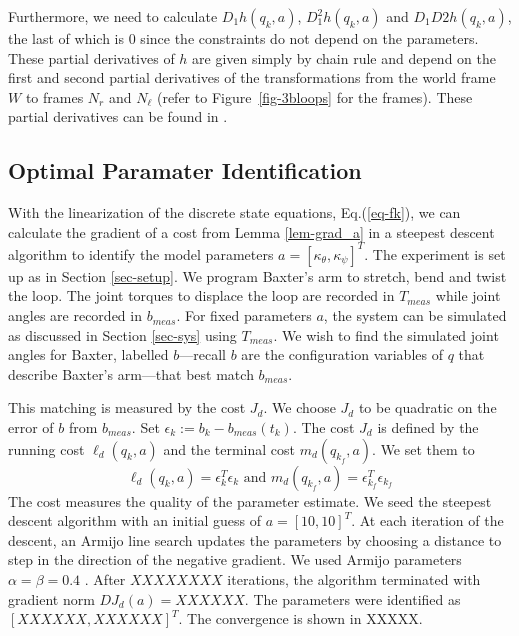 \documentclass[letterpaper, 10pt, conference]{ieeeconf}
\begin{document}
Furthermore, we need to calculate $D_1h(q_k,a)$, $D_1^2h(q_k,a)$ and $D_1D2h(q_k,a)$, the last of which is $0$ since the constraints do not depend on the parameters.  These partial derivatives of $h$ are given simply by chain rule and depend on the first and second partial derivatives of the transformations from the world frame $W$ to frames $N_r$ and $N_\ell$ (refer to Figure~\ref{fig-3bloops} for the frames).  These partial derivatives can be found in \cite{johnson_murphey_linearization}.  

\subsection{Optimal Paramater Identification}

With the linearization of the discrete state equations, Eq.(\ref{eq-fk}), we can calculate the gradient of a cost from Lemma \ref{lem-grad_a} in a steepest descent algorithm to identify the model parameters $a = [\kappa_\theta,\kappa_\psi]^T$.  The experiment is set up as in Section \ref{sec-setup}.  We program Baxter's arm to stretch, bend and twist the loop.  The joint torques to displace the loop are recorded in $T_{meas}$ while joint angles are recorded in $b_{meas}$.    For fixed parameters $a$, the system can be simulated as discussed in Section \ref{sec-sys} using $T_{meas}$.  We wish to find the simulated joint angles for Baxter, labelled $b$---recall $b$ are the configuration variables of $q$ that describe Baxter's arm---that best match $b_{meas}$.

This matching is measured by the cost $J_d$.  We choose $J_d$ to be quadratic on the error of $b$ from $b_{meas}$.   Set $\epsilon_k := b_k-b_{meas}(t_k)$.  The cost $J_d$ is defined by the running cost $\ell_d(q_k,a)$ and the terminal cost $m_d(q_{k_f},a)$.  We set them to
\[
\ell_d(q_k,a) = \epsilon_k^T\epsilon_k \textrm{ and } m_d(q_{k_f},a) = \epsilon_{k_f}^T\epsilon_{k_f}
\]
The cost measures the quality of the parameter estimate.  We seed the steepest descent algorithm with an initial guess of $a = [10, 10]^T$.  At each iteration of the descent, an Armijo line search updates the parameters by choosing a distance to step in the direction of the negative gradient.  We used Armijo parameters $\alpha = \beta = 0.4$ \cite{armijo}.  After $XXXXXXXX$ iterations, the algorithm terminated with gradient norm $DJ_d(a) = XXXXXX$.  The parameters were identified as $[XXXXXX,XXXXXX]^T$.  The convergence is shown in XXXXX.%
\end{document}
